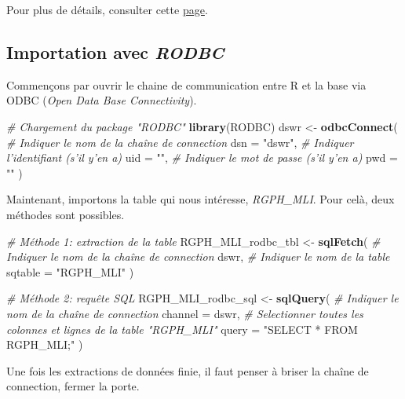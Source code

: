 \documentclass[]{book}
\newenvironment{Shaded}{\begin{snugshade}}{\end{snugshade}}
\newcommand{\KeywordTok}[1]{\textcolor[rgb]{0.13,0.29,0.53}{\textbf{#1}}}
\newcommand{\DataTypeTok}[1]{\textcolor[rgb]{0.13,0.29,0.53}{#1}}
\newcommand{\StringTok}[1]{\textcolor[rgb]{0.31,0.60,0.02}{#1}}
\newcommand{\CommentTok}[1]{\textcolor[rgb]{0.56,0.35,0.01}{\textit{#1}}}
\newcommand{\NormalTok}[1]{#1}
\begin{document}
Pour plus de détails, consulter cette
\href{https://db.rstudio.com/getting-started/}{page}.

\subsection{\texorpdfstring{Importation avec
\emph{RODBC}}{Importation avec RODBC}}\label{importation-avec-rodbc}

Commençons par ouvrir le chaine de communication entre R et la base via
ODBC (\emph{Open Data Base Connectivity}).

\begin{Shaded}
\begin{Highlighting}[]
\CommentTok{# Chargement du package "RODBC"}
\KeywordTok{library}\NormalTok{(RODBC) }
\NormalTok{dswr <-}\StringTok{ }\KeywordTok{odbcConnect}\NormalTok{(}
  \CommentTok{# Indiquer le nom de la chaîne de connection }
  \DataTypeTok{dsn =} \StringTok{"dswr"}\NormalTok{, }
  \CommentTok{# Indiquer l'identifiant (s'il y'en a)}
  \DataTypeTok{uid =} \StringTok{""}\NormalTok{, }
  \CommentTok{# Indiquer le mot de passe (s'il y'en a)}
  \DataTypeTok{pwd =} \StringTok{""} 
\NormalTok{  )}
\end{Highlighting}
\end{Shaded}

Maintenant, importons la table qui nous intéresse, \emph{RGPH\_MLI}.
Pour celà, deux méthodes sont possibles.

\begin{Shaded}
\begin{Highlighting}[]
\CommentTok{# Méthode 1: extraction de la table}
\NormalTok{RGPH_MLI_rodbc_tbl <-}\StringTok{ }\KeywordTok{sqlFetch}\NormalTok{(}
  \CommentTok{# Indiquer le nom de la chaîne de connection}
\NormalTok{  dswr, }
  \CommentTok{# Indiquer le nom de la table}
  \DataTypeTok{sqtable =} \StringTok{"RGPH_MLI"}
\NormalTok{  ) }

\CommentTok{# Méthode 2: requête SQL}
\NormalTok{RGPH_MLI_rodbc_sql <-}\StringTok{ }\KeywordTok{sqlQuery}\NormalTok{(}
  \CommentTok{# Indiquer le nom de la chaîne de connection}
  \DataTypeTok{channel =}\NormalTok{ dswr, }
  \CommentTok{# Selectionner toutes les colonnes et lignes de la table "RGPH_MLI"}
  \DataTypeTok{query =} \StringTok{"SELECT * FROM RGPH_MLI;"}
\NormalTok{  )}
\end{Highlighting}
\end{Shaded}

Une fois les extractions de données finie, il faut penser à briser la
chaîne de connection, fermer la porte.
\end{document}
